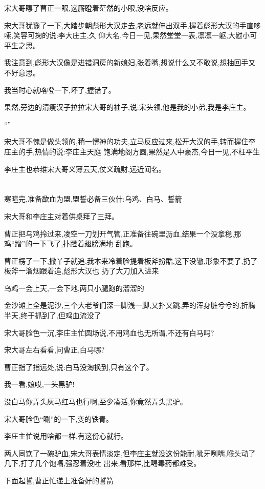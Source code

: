 ﻿\documentclass[12pt]{article}
\begin{document}
宋大哥瞟了曹正一眼,这厮瞪着茫然的小眼,没啥反应。

宋大哥犹豫了一下,大踏步朝彪形大汉走去,老远就伸出双手,握着彪形大汉的手直哆嗦,笑容可掬的说:李大庄主,久
仰大名,今日一见,果然堂堂一表,凛凛一躯,大慰小可平生之思。

我注意到,彪形大汉像是进错洞房的新媳妇,张着嘴,想说什么又不敢说,想抽回手又不好意思。

我当时心就咯噔一下,坏了,握错了。

果然,旁边的清瘦汉子拉拉宋大哥的袖子,说:宋头领,他是我的小弟,我是李庄主。

``\dldots ''

宋大哥不愧是做头领的,稍一愣神的功夫,立马反应过来,松开大汉的手,转而握住李庄主的手,热情的说:李庄主天庭
饱满地阁方圆,果然是人中豪杰,今日一见,不枉平生

李庄主也恭维宋大哥义薄云天,仗义疏财,远近闻名。
\section{}

寒暄完,准备歃血为盟,盟誓必备三伙什:乌鸡、白马、誓箭

宋大哥和李庄主对着供桌拜了三拜。

曹正把乌鸡拎过来,凌空一刀划开气管,正准备往碗里沥血,结果一个没拿稳,那鸡``蹭''的一下飞了,扑蹬着翅膀满地
乱跑。

曹正楞了一下,撒丫子就追,我本来冷着脸提着板斧扮酷,这下没辙,形象不要了,扔了板斧一溜烟跟着追,彪形大汉也
扔了大刀加入进来

乌鸡一会上天,一会下地,两只小腿跑的溜溜的\dldots

金沙滩上全是泥沙,三个大老爷们深一脚浅一脚,又扑又跳,弄的浑身脏兮兮的,折腾半天,终于抓到了,但鸡血流没了

宋大哥脸色一沉,李庄主忙圆场说,不用鸡血也无所谓,不还有白马吗?

宋大哥左右看看,问曹正,白马哪?

曹正指了指远处,说:白马没淘换到,只有这个了。

我一看,娘哎,一头黑驴!

没白马你弄头灰马红马也行啊,至少凑活,你竟然弄头黑驴。

宋大哥脸色``唰''的一下,变的铁青。

李庄主忙说用啥都一样,有这份心就行。

两人同饮了一碗驴血,宋大哥表情淡定,但李庄主就没这份能耐,呲牙咧嘴,喉头动了几下,打了几个饱嗝,强忍着没吐
出来,看那样,比喝毒药都难受。

下面起誓,曹正忙递上准备好的誓箭
\end{document}
